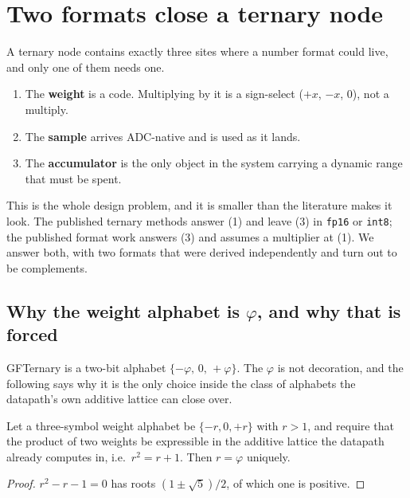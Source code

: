 \section{Two formats close a ternary node}\label{sec:pair}



A ternary node contains exactly three sites where a number format could live, and
only one of them needs one.

\begin{enumerate}
\item The \textbf{weight} is a code. Multiplying by it is a sign-select
      ($+x$, $-x$, $0$), not a multiply.
\item The \textbf{sample} arrives ADC-native and is used as it lands.
\item The \textbf{accumulator} is the only object in the system carrying a
      dynamic range that must be spent.
\end{enumerate}

This is the whole design problem, and it is smaller than the literature makes it
look. The published ternary methods answer (1) and leave (3) in \texttt{fp16} or
\texttt{int8}; the published format work answers (3) and assumes a multiplier at
(1). We answer both, with two formats that were derived independently and turn
out to be complements.

\subsection{Why the weight alphabet is \texorpdfstring{$\varphi$}{phi}, and why that is forced}


GFTernary is a two-bit alphabet $\{-\varphi,\,0,\,+\varphi\}$. The $\varphi$ is
not decoration, and the following says why it is the only choice inside the
class of alphabets the datapath's own additive lattice can close over.

\begin{theorem}
\label{thm:goldalpha}
Let a three-symbol weight alphabet be $\{-r,0,+r\}$ with $r>1$, and require that
the product of two weights be expressible in the additive lattice the datapath
already computes in, i.e.\ $r^2 = r + 1$. Then $r = \varphi$ uniquely.
\end{theorem}
\begin{proof}
$r^2 - r - 1 = 0$ has roots $(1\pm\sqrt5)/2$, of which one is positive.
\end{proof}

